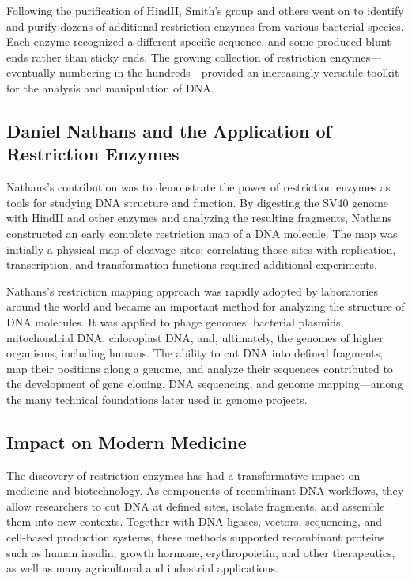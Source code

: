 Following the purification of HindII, Smith's group and others went on to identify and purify dozens of additional restriction enzymes from various bacterial species. Each enzyme recognized a different specific sequence, and some produced blunt ends rather than sticky ends. The growing collection of restriction enzymes---eventually numbering in the hundreds---provided an increasingly versatile toolkit for the analysis and manipulation of DNA.

\subsection{Daniel Nathans and the Application of Restriction Enzymes}

Nathans's contribution was to demonstrate the power of restriction enzymes as tools for studying DNA structure and function. By digesting the SV40 genome with HindII and other enzymes and analyzing the resulting fragments, Nathans constructed an early complete restriction map of a DNA molecule. The map was initially a physical map of cleavage sites; correlating those sites with replication, transcription, and transformation functions required additional experiments.

Nathans's restriction mapping approach was rapidly adopted by laboratories around the world and became an important method for analyzing the structure of DNA molecules. It was applied to phage genomes, bacterial plasmids, mitochondrial DNA, chloroplast DNA, and, ultimately, the genomes of higher organisms, including humans. The ability to cut DNA into defined fragments, map their positions along a genome, and analyze their sequences contributed to the development of gene cloning, DNA sequencing, and genome mapping---among the many technical foundations later used in genome projects.

\subsection{Impact on Modern Medicine}

The discovery of restriction enzymes has had a transformative impact on medicine and biotechnology. As components of recombinant-DNA workflows, they allow researchers to cut DNA at defined sites, isolate fragments, and assemble them into new contexts. Together with DNA ligases, vectors, sequencing, and cell-based production systems, these methods supported recombinant proteins such as human insulin, growth hormone, erythropoietin, and other therapeutics, as well as many agricultural and industrial applications.

